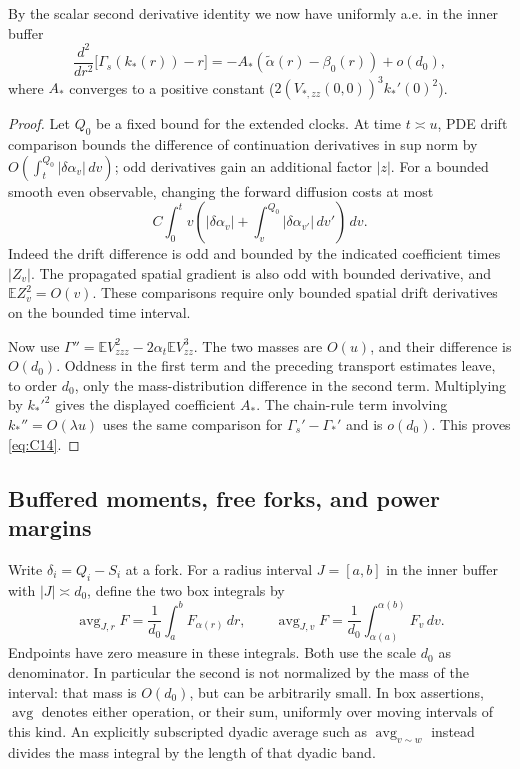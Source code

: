 \begin{lemma}\label{bud:curvature}

By the scalar second derivative identity we now have uniformly a.e. in the inner buffer
\[
 \frac{d^2}{dr^2}\big[\Gamma_s(k_*(r))-r\big]
       =-A_* (\widetilde\alpha(r)-\beta_0(r))+o(d_0),                     \tag{C14}\label{eq:C14}
\]
where \(A_*\) converges to a positive constant (\(2(V_{*,zz}(0,0))^3 k_*'(0)^2\)). \end{lemma}
\begin{proof}
Let \(Q_0\) be a fixed bound for the extended clocks. At time
\(t\asymp u\), PDE drift comparison bounds the difference of
continuation derivatives in sup norm by
\(O(\int_t^{Q_0}|\delta\alpha_v|\,dv)\); odd derivatives gain
an additional factor \(|z|\). For a bounded smooth even observable,
changing the forward diffusion costs at most
\[
 C\int_0^t v\left(|\delta\alpha_v|
          +\int_v^{Q_0}|\delta\alpha_{v'}|\,dv'\right)\,dv.
\]
Indeed the drift difference is odd and bounded by the indicated
coefficient times \(|Z_v|\). The propagated spatial gradient is also
odd with bounded derivative, and \(\mathbb EZ_v^2=O(v)\).
These comparisons require only bounded spatial drift derivatives on
the bounded time interval.

Now use
\(\Gamma''=\mathbb EV_{zzz}^2-2\alpha_t\mathbb EV_{zz}^3\).
The two masses are \(O(u)\), and their difference is \(O(d_0)\).
Oddness in the first term and the preceding transport estimates leave,
to order \(d_0\), only the mass-distribution difference in the second
term. Multiplying by \(k_*'^2\) gives the displayed coefficient
\(A_*\). The chain-rule term involving \(k_*''=O(\lambda u)\)
uses the same comparison for \(\Gamma_s'-\Gamma_*'\) and is
\(o(d_0)\). This proves \eqref{eq:C14}.

\end{proof}




\subsection{Buffered moments, free forks, and power margins}

Write \(\delta_i=Q_i-S_i\) at a fork. For a radius interval
\(J=[a,b]\) in the inner buffer with \(|J|\asymp d_0\), define
the two box integrals by
\[
 \operatorname{avg}_{J,r}F
   =\frac1{d_0}\int_a^b F_{\alpha(r)}\,dr,
 \qquad
 \operatorname{avg}_{J,v}F
   =\frac1{d_0}\int_{\alpha(a)}^{\alpha(b)}F_v\,dv.
\]
Endpoints have zero measure in these integrals. Both use the scale
\(d_0\) as denominator. In particular the second is not normalized by
the mass of the interval: that mass is \(O(d_0)\), but can be
arbitrarily small. In box assertions, \(\operatorname{avg}\) denotes
either operation, or their sum, uniformly over moving intervals of this
kind. An explicitly subscripted dyadic average such as
\(\operatorname{avg}_{v\sim w}\) instead divides the mass integral
by the length of that dyadic band.

